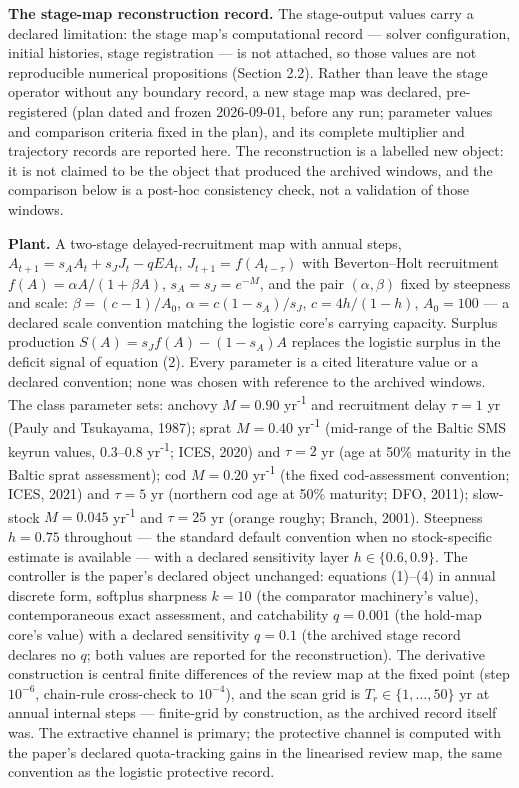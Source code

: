 \documentclass[11pt]{article}
\begin{document}
\textbf{The stage-map reconstruction record.} The stage-output values
carry a declared limitation: the stage map's computational record ---
solver configuration, initial histories, stage registration --- is not
attached, so those values are not reproducible numerical propositions
(Section 2.2). Rather than leave the stage operator without any boundary
record, a new stage map was declared, pre-registered (plan dated and
frozen 2026-09-01, before any run; parameter values and comparison
criteria fixed in the plan), and its complete multiplier and trajectory
records are reported here. The reconstruction is a labelled new object:
it is not claimed to be the object that produced the archived windows,
and the comparison below is a post-hoc consistency check, not a
validation of those windows.

\textbf{Plant.} A two-stage delayed-recruitment map with annual steps,
\(A_{t+1} = s_A A_t + s_J J_t - qE A_t\), \(J_{t+1} = f(A_{t-\tau})\)
with Beverton--Holt recruitment \(f(A) = \alpha A/(1+\beta A)\),
\(s_A = s_J = e^{-M}\), and the pair \((\alpha, \beta)\) fixed by
steepness and scale: \(\beta = (c-1)/A_0\), \(\alpha = c(1-s_A)/s_J\),
\(c = 4h/(1-h)\), \(A_0 = 100\) --- a declared scale convention matching
the logistic core's carrying capacity. Surplus production
\(S(A) = s_J f(A) - (1-s_A)A\) replaces the logistic surplus in the
deficit signal of equation (2). Every parameter is a cited literature
value or a declared convention; none was chosen with reference to the
archived windows. The class parameter sets: anchovy \(M = 0.90\) yr\textsuperscript{-1}
and recruitment delay \(\tau = 1\) yr (Pauly and Tsukayama, 1987); sprat
\(M = 0.40\) yr\textsuperscript{-1} (mid-range of the Baltic SMS keyrun values, 0.3--0.8
yr\textsuperscript{-1}; ICES, 2020) and \(\tau = 2\) yr (age at 50\% maturity in the
Baltic sprat assessment); cod \(M = 0.20\) yr\textsuperscript{-1} (the fixed
cod-assessment convention; ICES, 2021) and \(\tau = 5\) yr (northern cod
age at 50\% maturity; DFO, 2011); slow-stock \(M = 0.045\) yr\textsuperscript{-1} and
\(\tau = 25\) yr (orange roughy; Branch, 2001). Steepness \(h = 0.75\)
throughout --- the standard default convention when no stock-specific
estimate is available --- with a declared sensitivity layer
\(h \in \{0.6, 0.9\}\). The controller is the paper's declared object
unchanged: equations (1)--(4) in annual discrete form, softplus
sharpness \(k = 10\) (the comparator machinery's value), contemporaneous
exact assessment, and catchability \(q = 0.001\) (the hold-map core's
value) with a declared sensitivity \(q = 0.1\) (the archived stage
record declares no \(q\); both values are reported for the
reconstruction). The derivative construction is central finite
differences of the review map at the fixed point (step \(10^{-6}\),
chain-rule cross-check to \(10^{-4}\)), and the scan grid is
\(T_r \in \{1,\ldots,50\}\) yr at annual internal steps --- finite-grid
by construction, as the archived record itself was. The extractive
channel is primary; the protective channel is computed with the paper's
declared quota-tracking gains in the linearised review map, the same
convention as the logistic protective record.
\end{document}
